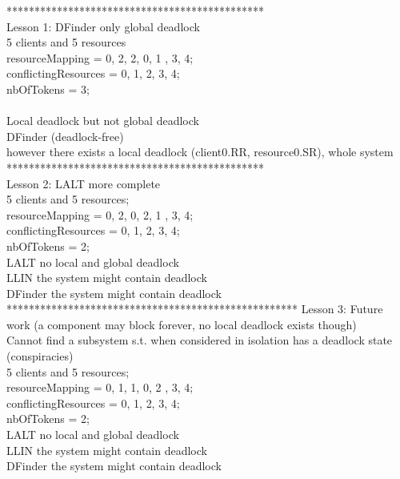 **********************************************\\
Lesson 1: DFinder only global deadlock \\
5 clients and 5 resources \\
resourceMapping = {{0, 2}, {2, 0}, {1} , {3}, {4}};\\
conflictingResources = {{0, 1}, {2, 3}, {4}};\\
nbOfTokens = 3;\\\\


Local deadlock but not global deadlock \\
DFinder (deadlock-free)\\
however there exists a local deadlock (client0.RR, resource0.SR), whole system \\
**********************************************\\
Lesson 2: LALT more complete \\
5 clients and 5 resources; \\
resourceMapping = {{0, 2}, {0, 2}, {1} , {3}, {4}};\\
conflictingResources = {{0, 1}, {2, 3, 4}};\\
nbOfTokens = 2;\\

LALT no local and global deadlock \\
LLIN the system might contain deadlock \\
DFinder the system might contain deadlock\\
****************************************************
Lesson 3: Future work (a component may block forever, no local deadlock exists though)\\
Cannot find a subsystem s.t. when considered in isolation has a deadlock state (conspiracies)\\

5 clients and 5 resources; \\
resourceMapping = {{0, 1}, {1, 0}, {2} , {3}, {4}};\\
conflictingResources = {{0, 1}, {2, 3, 4}};\\
nbOfTokens = 2;\\

LALT no local and global deadlock \\
LLIN the system might contain deadlock  \\
DFinder the system might contain deadlock\\


